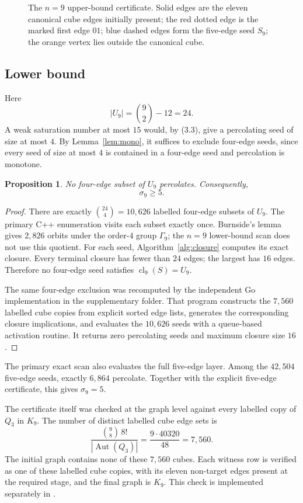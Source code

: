 \documentclass[11pt]{article}
\numberwithin{equation}{section}
\newtheorem{proposition}[theorem]{Proposition}
\newcommand{\cl}{\operatorname{cl}}
\newcommand{\Aut}{\operatorname{Aut}}
\begin{document}
\begin{figure}[t]
\centering
\resizebox{0.72\linewidth}{!}{}
\caption{The $n=9$ upper-bound certificate. Solid edges are the eleven canonical cube edges initially present; the red dotted edge is the marked first edge $01$; blue dashed edges form the five-edge seed $S_9$; the orange vertex lies outside the canonical cube.}
\label{fig:n9seed}
\end{figure}

\subsection{Lower bound}
Here
\[
|U_9|=\binom92-12=24.
\]
A weak saturation number at most $15$ would, by (3.3), give a percolating seed of size at most $4$. By Lemma~\ref{lem:mono}, it suffices to exclude four-edge seeds, since every seed of size at most $4$ is contained in a four-edge seed and percolation is monotone.

\begin{proposition}\label{prop:n9lower}
No four-edge subset of $U_9$ percolates. Consequently,
\[
\sigma_9\ge5.
\]
\end{proposition}

\begin{proof}
There are exactly $\binom{24}{4}=10,626$ labelled four-edge subsets of $U_9$. The primary C++ enumeration visits each subset exactly once. Burnside's lemma gives $2,826$ orbits under the order-$4$ group $\Gamma_9$; the $n=9$ lower-bound scan does not use this quotient. For each seed, Algorithm~\ref{alg:closure} computes its exact closure. Every terminal closure has fewer than $24$ edges; the largest has $16$ edges. Therefore no four-edge seed satisfies $\cl_9(S)=U_9$.

The same four-edge exclusion was recomputed by the independent Go implementation in the supplementary folder. That program constructs the $7,560$ labelled cube copies from explicit sorted edge lists, generates the corresponding closure implications, and evaluates the $10,626$ seeds with a queue-based activation routine. It returns zero percolating seeds and maximum closure size $16$.
\end{proof}

The primary exact scan also evaluates the full five-edge layer. Among the $42,504$ five-edge seeds, exactly $6,864$ percolate. Together with the explicit five-edge certificate, this gives $\sigma_9=5$.

The certificate itself was checked at the graph level against every labelled copy of $Q_3$ in $K_9$. The number of distinct labelled cube edge sets is
\[
\frac{\binom98\,8!}{|\Aut(Q_3)|}=\frac{9\cdot40320}{48}=7,560.
\tag{4.5}
\]
The initial graph contains none of these $7,560$ cubes. Each witness row is verified as one of these labelled cube copies, with its eleven non-target edges present at the required stage, and the final graph is $K_9$. This check is implemented separately in .
\end{document}
